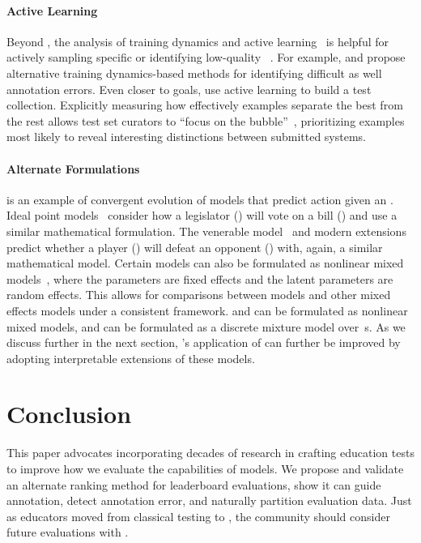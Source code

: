 \paragraph{\textbf{Active Learning}}
Beyond \irt{}, the analysis of training dynamics and active learning~\citep{settles09active} is helpful for actively sampling specific \itms{} or identifying low-quality \itms{}~\citep{brodley1999mislabel}.
For example, \citet{swayamdipta2020cartography} and \citet{pleiss2020aum} propose alternative training dynamics-based methods for identifying difficult \itms{} as well annotation errors.
Even closer to goals, \citet{rahman2020active} use active learning to build a test collection.
Explicitly measuring how effectively examples separate the best \subj{} from the rest allows test set curators to ``focus on the bubble''~\citep{boydgraber2020nerds}, prioritizing examples most likely to reveal interesting distinctions between submitted systems.

\paragraph{\textbf{Alternate Formulations}}
\irt{} is an example of convergent evolution of models that
predict \subj{} action given an \itm{}.
Ideal point models~\cite{poole2017voting} consider how a legislator (\subj{})
will vote on a bill (\itm{}) and use a similar mathematical formulation.
The venerable  model~\cite{glickman-99} and modern
extensions~\cite{herbrich-07} predict whether a player (\subj{}) will
defeat an opponent (\itm{}) with, again, a similar mathematical model.
Certain \irt{} models can also be formulated as nonlinear mixed
models~\cite{rijmen2003nonlinear}, where the \itm{} parameters are fixed effects
and the latent \subj{} parameters are random effects.
This allows for comparisons between \irt{} models and other mixed effects models
under a consistent framework.
        {\bf {}} and {\bf {}} can be formulated as nonlinear mixed models, and {\bf {}} can be formulated as a discrete mixture model over~\itm{}s.
As we discuss further in the next section, \name{}'s application of
\irt{} can further be improved by adopting interpretable extensions of
these models.


\section{Conclusion}
\label{ch:isicle:conc}

This paper advocates incorporating decades of research in crafting education tests to improve how we evaluate the capabilities of  models.
We propose and validate an alternate \irt{} ranking method for leaderboard evaluations, show it can guide annotation, detect annotation error, and naturally partition evaluation data.
Just as educators moved from classical testing to \irt{}, the \nlp{} community should consider future evaluations with \irt{}.


